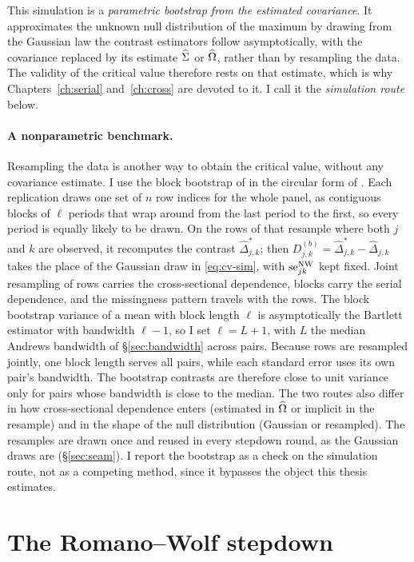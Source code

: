 This simulation is a \emph{parametric bootstrap from the estimated covariance}. It
approximates the unknown null distribution of the maximum by drawing from the Gaussian
law the contrast estimators follow asymptotically, with the covariance replaced by its
estimate $\widehat{\Sigma}$ or $\widehat{\Omega}$, rather than by resampling the data. The validity of the
critical value therefore rests on that estimate, which is why Chapters~\ref{ch:serial}
and~\ref{ch:cross} are devoted to it. I call it the \emph{simulation route} below.

\paragraph{A nonparametric benchmark.}
\label{par:mbb}
Resampling the data is another way to obtain the critical value, without any covariance
estimate. I use the block bootstrap of \citet{kunsch1989} in the circular form of
\citet{politisromano1992}. Each replication draws one set of $n$ row indices for the
whole panel, as contiguous blocks of $\ell$ periods that wrap around from the last
period to the first, so every period is equally likely to be drawn. On the rows of that
resample where both $j$ and $k$ are observed, it recomputes the contrast
$\hat{\Delta}^{*}_{j,k}$; then $D^{(b)}_{j,k}=\hat{\Delta}^{*}_{j,k}-\hat{\Delta}_{j,k}$
takes the place of the Gaussian draw in \eqref{eq:cv-sim}, with $\mathrm{se}^{\mathrm{NW}}_{jk}$ kept fixed.
Joint resampling of rows carries the cross-sectional dependence, blocks carry the serial
dependence, and the missingness pattern travels with the rows. The block bootstrap
variance of a mean with block length $\ell$ is asymptotically the Bartlett estimator
with bandwidth $\ell-1$, so I set $\ell=L+1$, with $L$ the median Andrews bandwidth of
\S\ref{sec:bandwidth} across pairs. Because rows are resampled jointly, one block length
serves all pairs, while each standard error uses its own pair's bandwidth. The bootstrap
contrasts are therefore close to unit variance only for pairs whose bandwidth is close to
the median. The two routes also differ in how cross-sectional dependence enters
(estimated in $\widehat{\Omega}$ or implicit in the resample) and in the shape of the null
distribution (Gaussian or resampled). The resamples are drawn once and reused in every
stepdown round, as the Gaussian draws are (\S\ref{sec:seam}). I report the bootstrap as
a check on the simulation route, not as a competing method, since it bypasses the object
this thesis estimates.

\section{The Romano--Wolf stepdown}
\label{sec:stepdown}


